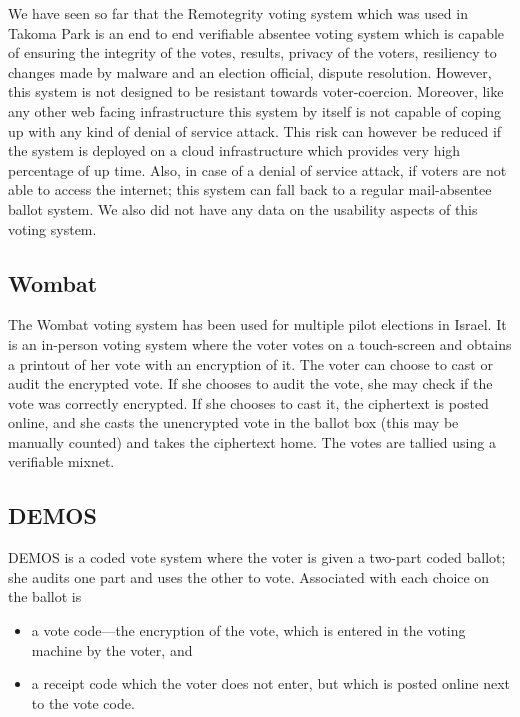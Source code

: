 We have seen so far that the Remotegrity voting system which was used
in Takoma Park is an end to end verifiable absentee voting system
which is capable of ensuring the integrity of the votes, results,
privacy of the voters, resiliency to changes made by malware and an
election official, dispute resolution. However, this system is not
designed to be resistant towards voter-coercion. Moreover, like any
other web facing infrastructure this system by itself is not capable
of coping up with any kind of denial of service attack. This risk can
however be reduced if the system is deployed on a cloud infrastructure
which provides very high percentage of up time. Also, in case of a
denial of service attack, if voters are not able to access the
internet; this system can fall back to a regular mail-absentee ballot
system. We also did not have any data on the usability aspects of this
voting system.

\subsection{Wombat~\cite{rosen2011}}

The Wombat voting system has been used for multiple pilot elections in
Israel. It is an in-person voting system where the voter votes on a
touch-screen and obtains a printout of her vote with an encryption of
it. The voter can choose to cast or audit the encrypted vote. If she
chooses to audit the vote, she may check if the vote was correctly
encrypted. If she chooses to cast it, the ciphertext is posted online,
and she casts the unencrypted vote in the ballot box (this may be
manually counted) and takes the ciphertext home. The votes are tallied
using a verifiable mixnet.

\subsection{DEMOS~\cite{kiayias2014}}

DEMOS is a coded vote system where the voter is given a two-part coded
ballot; she audits one part and uses the other to vote. Associated
with each choice on the ballot is

\begin{itemize}
\item a vote code---the encryption of the vote, which is entered in
  the voting machine by the voter, and
\item a receipt code which the voter does not enter, but which is
  posted online next to the vote code.
\end{itemize}


